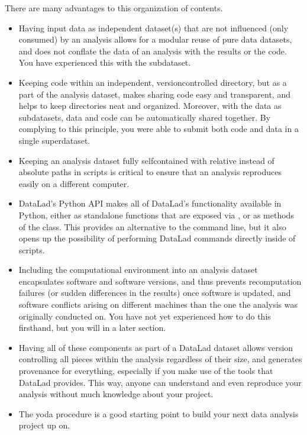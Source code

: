\sphinxAtStartPar
There are many advantages to this organization of contents.
\begin{itemize}
\item {} 
\sphinxAtStartPar
Having input data as independent dataset(s) that are not influenced (only
consumed) by an analysis allows for a modular reuse of pure data datasets,
and does not conflate the data of an analysis with the results or the code.
You have experienced this with the  subdataset.

\item {} 
\sphinxAtStartPar
Keeping code within an independent, version\sphinxhyphen{}controlled directory, but as a part
of the analysis dataset, makes sharing code easy and transparent, and helps
to keep directories neat and organized. Moreover,
with the data as subdatasets, data and code can be automatically shared together.
By complying to this principle, you were able to submit both code and data
in a single superdataset.

\item {} 
\sphinxAtStartPar
Keeping an analysis dataset fully self\sphinxhyphen{}contained with relative instead of
absolute paths in scripts is critical to ensure that an analysis reproduces
easily on a different computer.

\item {} 
\sphinxAtStartPar
DataLad’s Python API makes all of DataLad’s functionality available in
Python, either as standalone functions that are exposed via ,
or as methods of the  class.
This provides an alternative to the command line, but it also opens up the
possibility of performing DataLad commands directly inside of scripts.

\item {} 
\sphinxAtStartPar
Including the computational environment into an analysis dataset encapsulates
software and software versions, and thus prevents re\sphinxhyphen{}computation failures
(or sudden differences in the results) once
software is updated, and software conflicts arising on different machines
than the one the analysis was originally conducted on. You have not yet
experienced how to do this first\sphinxhyphen{}hand, but you will in a later section.

\item {} 
\sphinxAtStartPar
Having all of these components as part of a DataLad dataset allows version
controlling all pieces within the analysis regardless of their size, and
generates provenance for everything, especially if you make use of the tools
that DataLad provides. This way, anyone can understand and even reproduce
your analysis without much knowledge about your project.

\item {} 
\sphinxAtStartPar
The yoda procedure is a good starting point to build your next data analysis
project up on.

\end{itemize}


